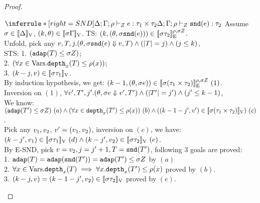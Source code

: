 \documentclass[a4paper,11pt]{article}
\theoremstyle{definition}
\begin{document}
\begin{proof}
\begin{mainitem}
\caseL
{
$
    \inferrule*[right = SND]{
      \Delta; \Gamma; \dmap \tvdash{\nnatA} \expr: \type_1 \times \type_2
    }{
      \Delta; \Gamma; \dmap \tvdash{\nnatA} \eprojr(\expr): \type_2
    }
$
}
Assume $ \sigma \in [\![ \Delta ]\!]_{\text{V}}$, $(k, \theta) \in [\![ \sigma \Gamma ]\!]_{\text{V}}$. TS: $(k, (\theta, \sigma \mathtt{snd}(e))) \in [\![ \sigma \tau_2 ]\!]_{\text{E}}^{\rho, \sigma Z} $.\\
%
Unfold, pick any $ v, T, j. (\theta, \sigma \mathtt{snd}(e) \mathrel{\Downarrow} v, T) \land (|T| = j) \land (j \leq k) $,\\
%
STS: 
1. $ (\mathtt{adap}(T) \leq \sigma Z)$;\\
%
2. $(\forall x \in \mbox{Vars}. \mathtt{depth}_{x}(T) \leq \rho(x))$;\\
%
3. $(k - j, v) \in [\![ \sigma \tau_1 ]\!]_{\text{V}} $.\\
%
By induction hypothesis, we get: $(k-1, (\theta, \sigma e)) \in [\![ \sigma (\tau_1 \times \tau_2) ]\!]_{\text{E}}^{\rho, \sigma Z} ~(1)$.\\
%
Inversion on $(1)$, $\forall v', T', j'. (\theta, \sigma e \mathrel{\Downarrow} v', T') \land (|T'| = j') \land (j' \leq k-1) $,\\
%
We know: $(\adap(\tr') \leq \ienv \nnatA) ~ (a) 
%
\land (\forall x \in \ddep{x}(\tr') \leq \dmap(x)) ~ (b)
%
\land ((\stepiA -1- j', \valr') \in \lrv{\ienv (\type_1 \times \type_2)}) ~ (c)$.\\
%
Pick any $v_1, v_2$, $v' = (v_1, v_2)$,
%
inversion on $(c)$, we have:\\
%
$(k - j', v_1) \in [\![ \sigma \tau_1 ]\!]_{\text{V}}~(d) \land (k - j', v_2) \in [\![ \sigma \tau_2 ]\!]_{\text{V}}~(e)$.\\
%
By E-SND, pick $v = v_2, j = j'+1, T = \mathtt{snd}(T')$, following 3 goals are proved:\\
%
1. $\mathtt{adap}(T) = \mathtt{adap}(\mathtt{snd}(T')) = \mathtt{adap}(T') \leq \sigma Z$ by $(a)$\\
%
2. $\forall x \in \mbox{Vars} .\mathtt{depth}_{x}(T) \implies \forall x . \mathtt{depth}_{x}(T') \leq
\rho(x)$ proved by $(b)$.\\
%
3. $(k - j, v) = (k -1 - j', v_2) \in [\![ \sigma \tau_2 ]\!]_{\text{V}}$
proved by $(e)$.\\



\end{mainitem}
\end{proof}
\end{document}
